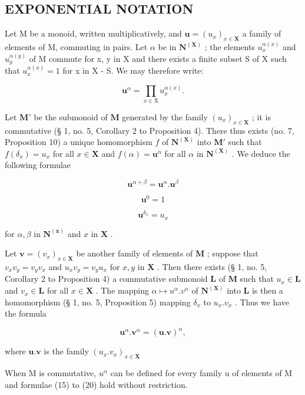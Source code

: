 \subsection{EXPONENTIAL NOTATION}

Let M be a monoid, written multiplicatively, and \(\mathbf{u} = (u_{x})_{x \in \mathbf{X}}\) a family of elements of M, commuting in pairs. Let \(\alpha\) be in \(\mathbf{N}^{(\mathbf{X})}\) ; the elements \(u_{x}^{\alpha(x)}\) and \(u_{y}^{\alpha(y)}\) of M commute for x, y in X and there exists a finite subset S of X such that \(u_{x}^{\alpha(x)} = 1\) for x in X - S. We may therefore write:

\[
\mathbf {u} ^ {\alpha} = \prod_ {x \in \mathrm{X}} u _ {x} ^ {\alpha (x)}.\tag{16}
\]

Let \(\mathbf{M}'\) be the submonoid of \(\mathbf{M}\) generated by the family \((u_x)_{x\in \mathbf{X}}\) ; it is commutative (§ 1, no. 5, Corollary 2 to Proposition 4). There thus exists (no. 7, Proposition 10) a unique homomorphism \(f\) of \(\mathbf{N}^{(\mathbf{X})}\) into \(\mathbf{M}'\) such that \(f(\delta_x) = u_x\) for all \(x\in \mathbf{X}\) and \(f(\alpha) = \mathbf{u}^{\alpha}\) for all \(\alpha\) in \(\mathbf{N}^{(\mathbf{X})}\) . We deduce the following formulae

\[
\mathbf {u} ^ {\alpha + \beta} = \mathbf {u} ^ {\alpha}. \mathbf {u} ^ {\beta}\tag{17}
\]

\[
\mathbf {u} ^ {0} = 1\tag{18}
\]

\[
\mathbf {u} ^ {\delta_ {x}} = u _ {x}\tag{19}
\]

for \(\alpha, \beta\) in \(\mathbf{N}^{(\mathbf{x})}\) and \(x\) in \(\mathbf{X}\) .

Let \(\mathbf{v} = (v_x)_{x \in \mathbf{X}}\) be another family of elements of \(\mathbf{M}\) ; suppose that \(v_x v_y = v_y v_x\) and \(u_x v_y = v_y u_x\) for \(x, y\) in \(\mathbf{X}\) . Then there exists (§ 1, no. 5, Corollary 2 to Proposition 4) a commutative submonoid \(\mathbf{L}\) of \(\mathbf{M}\) such that \(u_x \in \mathbf{L}\) and \(v_x \in \mathbf{L}\) for all \(x \in \mathbf{X}\) . The mapping \(\alpha \mapsto u^\alpha . v^\alpha\) of \(\mathbf{N}^{(\mathbf{X})}\) into \(\mathbf{L}\) is then a homomorphism (§ 1, no. 5, Proposition 5) mapping \(\delta_x\) to \(u_x . v_x\) . Thus we have the formula

\[
\mathbf {u} ^ {\alpha}. \mathbf {v} ^ {\alpha} = (\mathbf {u}. \mathbf {v}) ^ {\alpha},\tag{20}
\]

where \(\mathbf{u}.\mathbf{v}\) is the family \((u_x.v_x)_{x\in \mathbf{X}}\)

When M is commutative, \(u^{\alpha}\) can be defined for every family u of elements of M and formulae (15) to (20) hold without restriction.

